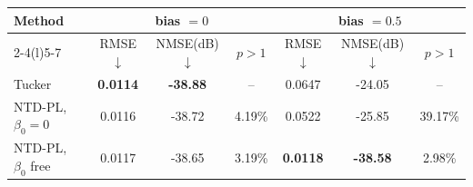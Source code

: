 \begin{tabular}{@{}l ccc ccc@{}}
\toprule
\multirow{2}{*}{Method} &
\multicolumn{3}{c}{bias \(=0\)} &
\multicolumn{3}{c}{bias \(=0.5\)} \\
\cmidrule(lr){2-4}\cmidrule(l){5-7}
& RMSE$\downarrow$ & NMSE(dB)$\downarrow$ & \(p>1\) &
  RMSE$\downarrow$ & NMSE(dB)$\downarrow$ & \(p>1\) \\
\midrule
Tucker & \textbf{0.0114} & \textbf{-38.88} & -- &
0.0647 & -24.05 & -- \\
NTD-PL, \(\beta_0=0\) & 0.0116 & -38.72 & 4.19\% &
0.0522 & -25.85 & 39.17\% \\
NTD-PL, \(\beta_0\) free & 0.0117 & -38.65 & 3.19\% &
\textbf{0.0118} & \textbf{-38.58} & 2.98\% \\
\bottomrule
\end{tabular}
